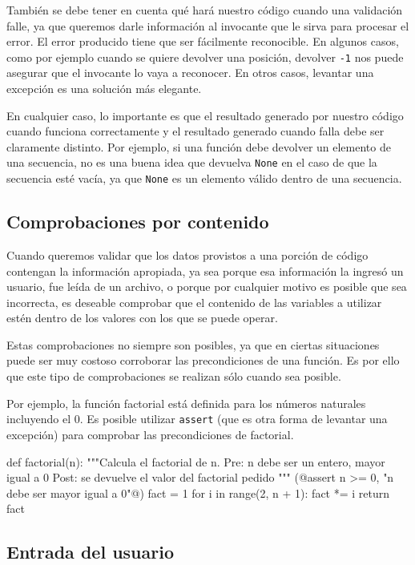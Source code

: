 También se debe tener en cuenta qué hará nuestro código cuando una
validación falle, ya que queremos darle información al invocante que le sirva
para procesar el error. El error producido tiene que ser fácilmente
reconocible.  En algunos casos, como por ejemplo cuando se quiere devolver
una posición, devolver \lstinline!-1! nos puede asegurar que el invocante
lo vaya a reconocer. En otros casos, levantar una excepción es una solución
más elegante.

En cualquier caso, lo importante es que el resultado generado por nuestro
código cuando funciona correctamente y el resultado generado cuando falla
debe ser claramente distinto. Por ejemplo, si una función debe devolver un
elemento de una secuencia, no es una buena idea que devuelva
\lstinline!None! en el caso de que la secuencia esté vacía, ya que
\lstinline!None! es un elemento válido dentro de una secuencia.

\subsection{Comprobaciones por contenido}

Cuando queremos validar que los datos provistos a una porción de código
contengan la información apropiada, ya sea porque esa información la ingresó
un usuario, fue leída de un archivo, o porque por cualquier motivo es posible
que sea incorrecta, es deseable comprobar que el contenido de las variables a
utilizar estén dentro de los valores con los que se puede operar.

Estas comprobaciones no siempre son posibles, ya que en ciertas situaciones
puede ser muy costoso corroborar las precondiciones de una función. Es por
ello que este tipo de comprobaciones se realizan sólo cuando sea posible.

Por ejemplo, la función factorial está definida para los números naturales
incluyendo el 0. Es posible utilizar \lstinline!assert! (que es otra forma de
levantar una excepción) para comprobar las precondiciones de factorial.

\begin{codigo-python}
def factorial(n):
    """Calcula el factorial de n.
    Pre: n debe ser un entero, mayor igual a 0
    Post: se devuelve el valor del factorial pedido
    """
    (@assert n >= 0, "n debe ser mayor igual a 0"@)
    fact = 1
    for i in range(2, n + 1):
        fact *= i
    return fact
\end{codigo-python}

\subsection{Entrada del usuario}

